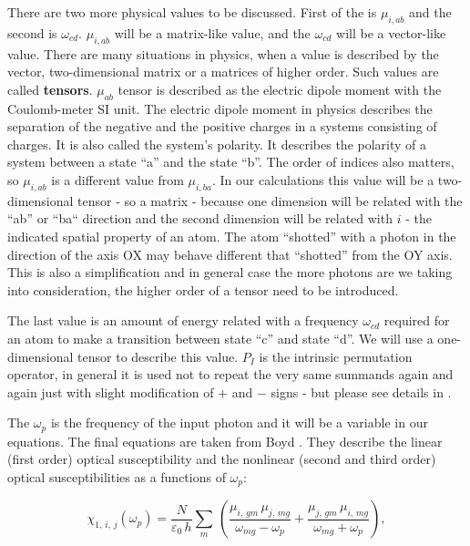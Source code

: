 \documentclass[12pt,twoside,a4paper]{article}
\numberwithin{equation}{subsection}
\numberwithin{figure}{subsection}
\begin{document}
There are two more physical values to be discussed. First of the is $\mu_{i, ab}$ and the second is $\omega_{cd}$. $\mu_{i, ab}$ will be a
matrix-like value, and the $\omega_{cd}$ will be a vector-like value. There are many situations in physics, when a value is
described by the vector, two-dimensional matrix or a matrices of higher order. Such values are called \textbf{tensors}. $\mu_{ab}$ tensor
is described as the electric dipole moment with the Coulomb-meter SI unit. The electric dipole moment in physics describes the separation of
the negative and the positive charges in a systems consisting of charges. It is also called the system's polarity. It describes the polarity
of a system between a state ``a'' and the state ``b''. The order of indices also matters, so $\mu_{i, ab}$ is a different value from
$\mu_{i, ba}$. In our calculations this value will be a two-dimensional tensor - so a matrix - because one dimension will be related with
the ``ab'' or ``ba`` direction and the second dimension will be related with $i$ - the indicated spatial property of an atom. The atom
``shotted'' with a photon in the direction of the axis OX may behave different that ``shotted'' from the OY axis. This is also a
simplification and in general case the more photons are we taking into consideration, the higher order of a tensor need to be introduced.

The last value is an amount of energy related with a frequency $\omega_{cd}$ required for an atom to make a transition between state
``c'' and state ``d''. We will use a one-dimensional tensor to describe this value. $P_{I}$ is the intrinsic permutation operator, in
general it is used not to repeat the very same summands again and again just with slight modification of $+$ and $-$ signs - but please see
details in \cite{boyd_nlo}.

The $\omega_{p}$ is the frequency of the input photon and it will be a variable in our equations. The final equations are taken from Boyd
\cite{boyd_nlo}. They describe the linear (first order) optical susceptibility and the nonlinear (second and third order) optical
susceptibilities as a functions of $\omega_{p}$:


\begin{equation} \label{eq:sresults_linear}   
  { \chi_{1, \, i, \, j } } ( {\omega_{p} } ) = \frac {N} { {\varepsilon_{0} } \, h} 
    \sum_{m} \, 
      ( \frac { {\mu_{i, \, gm} } \, {\mu_{j, \, mg} } } { {\omega_{mg} } - {\omega_{p} } } 
      + \frac { {\mu_{j, \, gm} } \, {\mu_{i, \, mg} } } { {\omega_{mg} } + {\omega_{p} } } ),
\end{equation}
\end{document}
